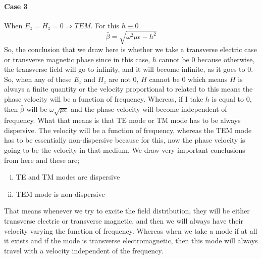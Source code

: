 \paragraph{Case 3}When $E_z = H_z = 0 \Rightarrow TEM$. For this $h \equiv 0$
\begin{dmath*}
\bar{\beta} = \sqrt{\omega^2\mu\epsilon - h^2}
\end{dmath*}
So, the conclusion that we draw here is whether we take a transverse electric case or transverse magnetic phase since in this case, $h$ cannot be 0 because otherwise, the transverse field will go to infinity, and it will become infinite, as it goes to 0. So, when any of these  $E_z$ and $H_z$ are not 0, $H$ cannot be 0 which means $H$ is always a finite quantity or the velocity proportional to related to this means the phase velocity will be a function of frequency. Whereas, if I take $h$ is equal to 0, then $\bar{\beta}$ will be $\omega \sqrt{\mu\epsilon}$ and the phase velocity will become independent of frequency. What that means is that TE mode or TM mode has to be always dispersive. The velocity will be a function of frequency, whereas the TEM mode has to be essentially non-dispersive because for this, now the phase velocity is going to be the velocity in that medium. We draw very important conclusions from here and these are;
\begin{enumerate}[(i)]
\item TE and TM modes are dispersive
\item TEM mode is non-dispersive
\end{enumerate}
That means whenever we try to excite the field distribution, they will be either transverse electric or transverse magnetic, and then we will always have their velocity varying the function of frequency. Whereas when we take a mode if at all it exists and if the mode is transverse electromagnetic, then this mode will always travel with a velocity independent of the frequency.

